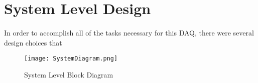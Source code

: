 \section{System Level Design}

\paragraph{}
In order to accomplish all of the tasks necessary for this DAQ, there were several design choices that 

\begin{figure}[H]
	\centering
	\texttt{[image: SystemDiagram.png]}
	\caption{System Level Block Diagram}
	\label{fig:SysDiagram}
\end{figure}
